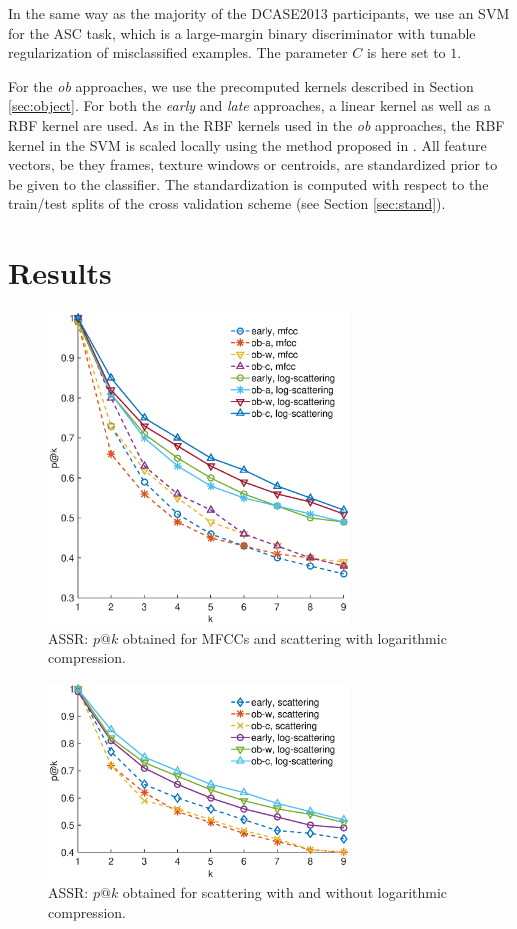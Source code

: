 \documentclass[journal]{IEEEtran}
\begin{document}
In the same way as the majority of the DCASE2013 participants, we use an SVM for the ASC task, which is a large-margin binary discriminator with tunable regularization of misclassified examples. The parameter $C$ is here set to $1$.

For the \emph{ob} approaches, we use the precomputed kernels described in Section \ref{sec:object}. For both the \emph{early} and \emph{late} approaches, a linear kernel as well as a RBF kernel are used. As in the RBF kernels used in the \emph{ob} approaches, the RBF kernel in the SVM is scaled locally using the method proposed in \cite{selfTuneManor2004}. All feature vectors, be they frames, texture windows or centroids, are standardized prior to be given to the classifier. The standardization is computed with respect to the train/test splits of the cross validation scheme (see Section \ref{sec:stand}).

\section{Results \label{sec:results}}

\begin{figure}
\begin{center}
\includegraphics[width=8cm]{gfx/unsupervised_test3.eps}
\caption{ASSR: $p@k$ obtained for MFCCs and scattering with logarithmic compression.}
\label{fig:ASS_1}
\end{center}
\end{figure}

\begin{figure}
\begin{center}
\includegraphics[width=8cm]{gfx/unsupervised_test2.eps}
\caption{ASSR: $p@k$ obtained for scattering with and without logarithmic compression.}
\label{fig:ASS_2}
\end{center}
\end{figure}
\end{document}
